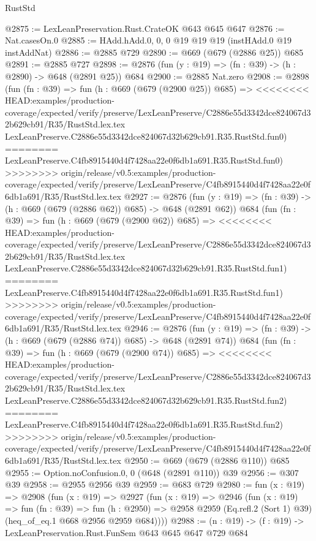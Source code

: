 \begin{lexlean}{RustStd}
\begin{coremodule}
{\begin{coremodule}
{{{{{{{@2875 := LexLeanPreservation.Rust.CrateOK @643 @645 @647
@2876 := Nat.casesOn.{0}
@2885 := HAdd.hAdd.{0, 0, 0} @19 @19 @19 (instHAdd.{0} @19 instAddNat)
@2886 := @2885 @729
@2890 := @669 (@679 (@2886 @25)) @685
@2891 := @2885 @727
@2898 := @2876 (fun (y : @19) => (fn : @39) -> (h : @2890) -> @648 (@2891 @25)) @684
@2900 := @2885 Nat.zero
@2908 := @2898
    (fun (fn : @39) =>
    fun (h : @669 (@679 (@2900 @25)) @685) =>
<<<<<<<< HEAD:examples/production-coverage/expected/verify/preserve/LexLeanPreserve/C2886e55d3342dce824067d32b629cb91/R35/RustStd.lex.tex
    LexLeanPreserve.C2886e55d3342dce824067d32b629cb91.R35.RustStd.fun0)
========
    LexLeanPreserve.C4fb8915440d4f7428aa22e0f6db1a691.R35.RustStd.fun0)
>>>>>>>> origin/release/v0.5:examples/production-coverage/expected/verify/preserve/LexLeanPreserve/C4fb8915440d4f7428aa22e0f6db1a691/R35/RustStd.lex.tex
@2927 := @2876
    (fun (y : @19) => (fn : @39) -> (h : @669 (@679 (@2886 @62)) @685) -> @648 (@2891 @62))
    @684
    (fun (fn : @39) =>
    fun (h : @669 (@679 (@2900 @62)) @685) =>
<<<<<<<< HEAD:examples/production-coverage/expected/verify/preserve/LexLeanPreserve/C2886e55d3342dce824067d32b629cb91/R35/RustStd.lex.tex
    LexLeanPreserve.C2886e55d3342dce824067d32b629cb91.R35.RustStd.fun1)
========
    LexLeanPreserve.C4fb8915440d4f7428aa22e0f6db1a691.R35.RustStd.fun1)
>>>>>>>> origin/release/v0.5:examples/production-coverage/expected/verify/preserve/LexLeanPreserve/C4fb8915440d4f7428aa22e0f6db1a691/R35/RustStd.lex.tex
@2946 := @2876
    (fun (y : @19) => (fn : @39) -> (h : @669 (@679 (@2886 @74)) @685) -> @648 (@2891 @74))
    @684
    (fun (fn : @39) =>
    fun (h : @669 (@679 (@2900 @74)) @685) =>
<<<<<<<< HEAD:examples/production-coverage/expected/verify/preserve/LexLeanPreserve/C2886e55d3342dce824067d32b629cb91/R35/RustStd.lex.tex
    LexLeanPreserve.C2886e55d3342dce824067d32b629cb91.R35.RustStd.fun2)
========
    LexLeanPreserve.C4fb8915440d4f7428aa22e0f6db1a691.R35.RustStd.fun2)
>>>>>>>> origin/release/v0.5:examples/production-coverage/expected/verify/preserve/LexLeanPreserve/C4fb8915440d4f7428aa22e0f6db1a691/R35/RustStd.lex.tex
@2950 := @669 (@679 (@2886 @110)) @685
@2955 := Option.noConfusion.{0, 0} (@648 (@2891 @110)) @39
@2956 := @307 @39
@2958 := @2955 @2956 @39
@2959 := @683 @729
@2980 := fun (x : @19) =>
  @2908
    (fun (x : @19) =>
    @2927
      (fun (x : @19) =>
      @2946
        (fun (x : @19) =>
        fun (fn : @39) =>
        fun (h : @2950) =>
        @2958 @2959 (Eq.refl.{2} (Sort 1) @39) (heq_of_eq.{1} @668 @2956 @2959 @684))))
@2988 := (n : @19) -> (f : @19) -> LexLeanPreservation.Rust.FunSem @643 @645 @647 @729 @684
}}}}}}}
\end{coremodule}}
\end{coremodule}
\end{lexlean}
